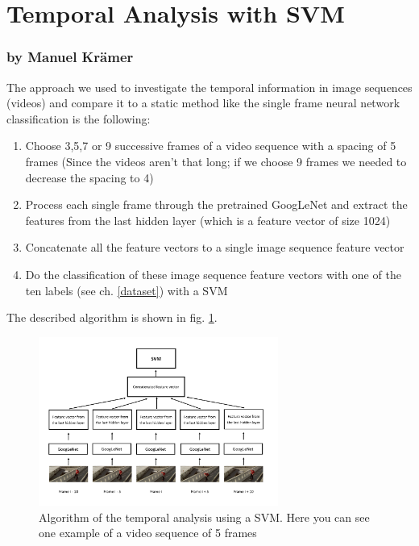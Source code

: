 \documentclass[11pt]{report}
\begin{document}
\section{Temporal Analysis with SVM}
\label{TempAnalysis_SVM}
\subsubsection{by Manuel Krämer}
The approach we used to investigate the temporal information in image sequences (videos) and compare it to a static method like the single frame neural network classification is the following:

\begin{enumerate} 
\item Choose 3,5,7 or 9 successive frames of a video sequence with a spacing of 5 frames (Since the videos aren't that long; if we choose 9 frames we needed to decrease the spacing to 4)
\item Process each single frame through the pretrained GoogLeNet and extract the features from the last hidden layer (which is a feature vector of size 1024)
\item Concatenate all the feature vectors to a single image sequence feature vector
\item Do the classification of these image sequence feature vectors with one of the ten labels (see ch. \ref{dataset}) with a SVM
\end{enumerate}

The described algorithm is shown in fig. \ref{fig_svm}.

\begin{figure}
  \centering
  \includegraphics[width=0.7\textwidth]{Illustration_SVM.png}
  \caption{Algorithm of the temporal analysis using a SVM. Here you can see one example of a video sequence of 5 frames}
  \label{fig_svm}
\end{figure}
\end{document}

